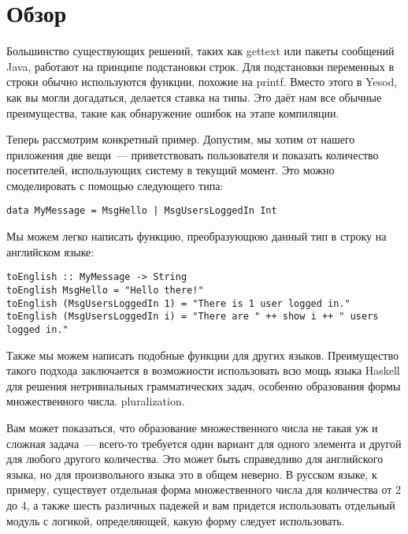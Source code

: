 \section{Обзор} %

Большинство существующих решений, таких как gettext или пакеты сообщений Java,
работают на принципе подстановки строк. Для подстановки переменных в строки
обычно используются функции, похожие на printf. Вместо этого в Yesod, как вы
могли догадаться, делается ставка на типы. Это даёт нам все обычные
преимущества, такие как обнаружение ошибок на этапе компиляции.

Теперь рассмотрим конкретный пример. Допустим, мы хотим от нашего приложения
две вещи~--- приветствовать пользователя и показать количество посетителей,
использующих систему в текущий момент. Это можно смоделировать с помощью
следующего типа:

\begin{lstlisting}
data MyMessage = MsgHello | MsgUsersLoggedIn Int
\end{lstlisting}

Мы можем легко написать функцию, преобразующюю данный тип в строку на
английском языке:

\begin{lstlisting}
toEnglish :: MyMessage -> String
toEnglish MsgHello = "Hello there!"
toEnglish (MsgUsersLoggedIn 1) = "There is 1 user logged in."
toEnglish (MsgUsersLoggedIn i) = "There are " ++ show i ++ " users logged in."
\end{lstlisting}

Также мы можем написать подобные функции для других языков. Преимущество такого
подхода заключается в возможности использовать всю мощь языка Haskell для
решения нетривиальных грамматических задач, особенно образования формы
множественного числа. %
pluralization.

\begin{remark}
    Вам может показаться, что образование множественного числа не такая уж и
    сложная задача~--- всего-то требуется один вариант для одного элемента и
    другой для любого другого количества. Это может быть справедливо для
    английского языка, но для произвольного языка это в общем неверно. В
    русском языке, к примеру, существует отдельная форма множественного числа
    для количества от 2 до 4, а также шесть различных падежей и вам придется
    использовать отдельный модуль с логикой, определяющей, какую форму следует
    использовать.
\end{remark}

